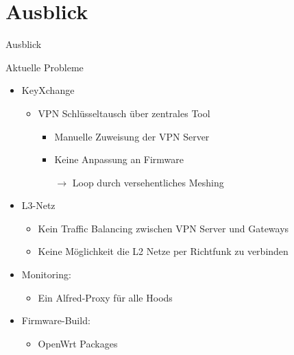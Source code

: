 \section{Ausblick}
\begin{frame}{}
    \begin{center}
        Ausblick
     \end{center}
\end{frame}

\begin{frame}{Aktuelle Probleme}
    \begin{itemize}
        \item KeyXchange
        \begin{itemize}
            \item VPN Schlüsseltausch über zentrales Tool
            \begin{itemize}
                \item Manuelle Zuweisung der VPN Server
                \item Keine Anpassung an Firmware
                \item[$\rightarrow$] Loop durch versehentliches Meshing
            \end{itemize}
        \end{itemize}
        \item L3-Netz
        \begin{itemize}
            \item Kein Traffic Balancing zwischen VPN Server und Gateways
            \item Keine Möglichkeit die L2 Netze per Richtfunk zu verbinden
        \end{itemize}
        \item Monitoring:
        \begin{itemize}
            \item Ein Alfred-Proxy für alle Hoods
        \end{itemize}
        \item Firmware-Build:
        \begin{itemize}
            \item OpenWrt Packages
        \end{itemize}
    \end{itemize}
\end{frame}

